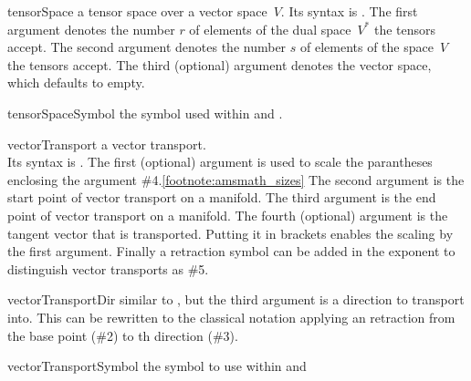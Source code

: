 \documentclass[english,a4paper,DIV=12,parskip=full,oneside]{scrartcl}
\begin{document}
\begin{commandlist}
		\par{}
		\par{}
	\item[tensorSpace] a tensor space over a vector space~$V$.
		Its syntax is .
		The first argument denotes the number $r$ of elements of the dual space~$V^*$ the tensors accept.
		The second argument denotes the number $s$ of elements of the space~$V$ the tensors accept.
		The third (optional) argument denotes the vector space, which defaults to empty.
		\par{}
		\par{}
	\item[tensorSpaceSymbol] the symbol used within \codeCommand{\tensorSpace} and \codeCommand{\tensorBundle}.
		\par\mathCodeExample{\tensorSpaceSymbol}
	\item[vectorTransport] a vector transport.\\
		Its syntax is .
		The first (optional) argument is used to scale the parantheses enclosing the argument \#4.\cref{footnote:amsmath_sizes}
		The second argument is the start point of vector transport on a manifold.
		The third argument is the end point of vector transport on a manifold.
		The fourth (optional) argument is the tangent vector that is transported.
		Putting it in brackets enables the scaling by the first argument.
		Finally a retraction symbol can be added in the exponent to distinguish vector transports as \#5.
		\par{}
		\par{}
		\par{}
		\par{}
	\item[vectorTransportDir] similar to \codeCommand{\vectorTransport}, but the third
		argument is a direction to transport into. This can be rewritten to the classical notation
		applying an retraction from the base point (\#2) to th direction (\#3).
		\par{}
		\par{}
		\par{}
		\par{}
	\item[vectorTransportSymbol]\hspace*{2em}the symbol to use within \codeCommand{\vectorTransport} and \codeCommand{\vectorTransportDir}
		\par\mathCodeExample{\vectorTransportSymbol}
\end{commandlist}
\end{document}
